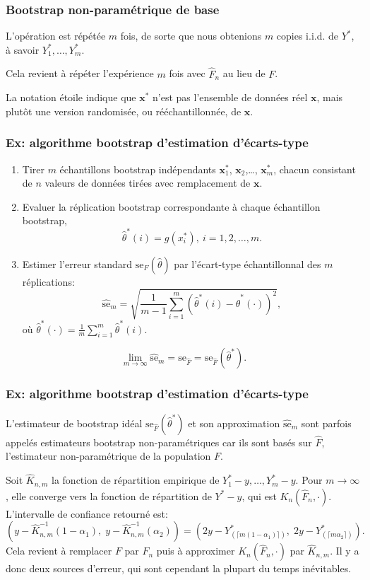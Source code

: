\documentclass[t,usepdftitle=false]{beamer}
\def\bx{\boldsymbol{x}}
\begin{document}
\begin{frame}
\frametitle{Bootstrap non-paramétrique de base}

L'opération est répétée ${m}$ fois, de sorte que nous obtenions $m$
copies i.i.d. de $Y^*$, à savoir ${Y_1^*},\dots,{Y_m^*}$.

\mbox{}

Cela revient à répéter l'expérience $m$ fois avec $\hat F_n$ au lieu de $F$.

\mbox{}

La notation étoile indique que $\bx^*$ n'est pas l'ensemble de données
réel $\bx$, mais plutôt une version randomisée, ou rééchantillonnée,
de $\bx$.

\end{frame}

\begin{frame}
\frametitle{Ex: algorithme bootstrap d'estimation d'écarts-type}

\begin{enumerate}
\item
Tirer $m$ échantillons bootstrap indépendants $\bx^*_1$,
$\bx_2$,\ldots, $\bx^*_m$, chacun consistant de $n$ valeurs de données
tirées avec remplacement de $\bx$.
\item
Evaluer la réplication bootstrap correspondante à chaque échantillon
bootstrap,
\[
\hat{\theta}^*(i) = g(x_i^*),\ i = 1,2,\ldots,m.
\]
\item
Estimer l'erreur standard $\mbox{se}_F(\hat{\theta})$ par l'écart-type
échantillonnal des $m$ réplications:
\[
\hat{\mbox{se}}_m = \sqrt{\frac{1}{m-1} \sum_{i = 1}^m (\hat{\theta}^*(i) -
  \hat{\theta}^*(\cdot))^2},
\]
où $\hat{\theta}^*(\cdot) = \frac{1}{m} \sum_{i = 1}^m \hat{\theta}^*(i)$.
\end{enumerate}

\[
\lim_{m \rightarrow \infty} \hat{\mbox{se}}_m = \mbox{se}_{\hat{F}}
= \mbox{se}_{\hat{F}}(\hat{\theta}^*).
\] 

\end{frame}

\begin{frame}
\frametitle{Ex: algorithme bootstrap d'estimation d'écarts-type}

L'estimateur de bootstrap idéal $\mbox{se}_{\hat{F}}(\hat{\theta}^*)$
et son approximation $\hat{\mbox{se}}_m$ sont parfois appelés
estimateurs bootstrap non-paramétriques car ils sont basés sur
$\hat{F}$, l'estimateur non-paramétrique de la population $F$.

Soit ${\hat K_{n,m}}$ la fonction de répartition empirique de
$Y_1^*-y, \dots, Y_m^*-y$.
Pour $m\to\infty$, elle converge vers la fonction de répartition de
$Y^* - y$, qui est $K_n(\hat F_n,\cdot)$.
L'intervalle de confiance retourné est:
\[
  (y - \hat K_{n,m}^{-1}(1-\alpha_1),\; 
   y - \hat K_{n,m}^{-1}(\alpha_2))
 = (2y - Y_{(\lceil m(1-\alpha_1)\rceil)}^*,\;
    2y - Y_{(\lceil m\alpha_2\rceil)}^*).
\]
Cela revient à remplacer $F$ par $\hat F_n$ puis à approximer
$K_n(\hat F_n,\cdot)$ par $\hat K_{n,m}$.
Il y a donc deux sources d'erreur, qui sont cependant la plupart du temps inévitables.

\end{frame}
\end{document}
